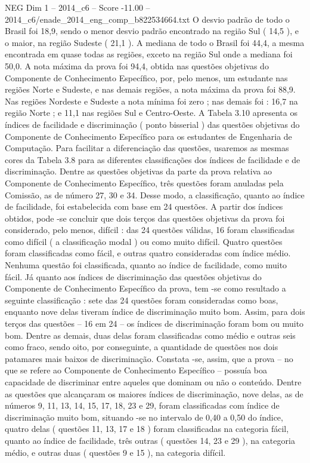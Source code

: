 \begin{textsample}{NEG Dim 1 – 2014\_c6 – Score -11.00 – 2014\_c6/enade\_2014\_eng\_comp\_b822534664.txt}
O desvio padrão de todo o Brasil foi 18,9, sendo o menor desvio padrão encontrado na região Sul ( 14,5 ), e o maior, na região Sudeste ( 21,1 ).
A mediana de todo o Brasil foi 44,4, a mesma encontrada em quase todas as regiões, exceto na região Sul onde a mediana foi 50,0.
A nota máxima da prova foi 94,4, obtida nas questões objetivas do Componente de Conhecimento Específico, por, pelo menos, um estudante nas regiões Norte e Sudeste, e nas demais regiões, a nota máxima da prova foi 88,9.
Nas regiões Nordeste e Sudeste a nota mínima foi zero ; nas demais foi : 16,7 na região Norte ; e 11,1 nas regiões Sul e Centro-Oeste.
A Tabela 3.10 apresenta os índices de facilidade e discriminação ( ponto bisserial ) das questões objetivas do Componente de Conhecimento Específico para os estudantes de Engenharia de Computação.
Para facilitar a diferenciação das questões, usaremos as mesmas cores da Tabela 3.8 para as diferentes classificações dos índices de facilidade e de discriminação.
Dentre as questões objetivas da parte da prova relativa ao Componente de Conhecimento Específico, três questões foram anuladas pela Comissão, as de número 27, 30 e 34.
Desse modo, a classificação, quanto ao índice de facilidade, foi estabelecida com base em 24 questões.
A partir dos índices obtidos, pode -se concluir que dois terços das questões objetivas da prova foi considerado, pelo menos, difícil : das 24 questões válidas, 16 foram classificadas como difícil ( a classificação modal ) ou como muito difícil.
Quatro questões foram classificadas como fácil, e outras quatro consideradas com índice médio.
Nenhuma questão foi classificada, quanto ao índice de facilidade, como muito fácil.
Já quanto aos índices de discriminação das questões objetivas do Componente de Conhecimento Específico da prova, tem -se como resultado a seguinte classificação : sete das 24 questões foram consideradas como boas, enquanto nove delas tiveram índice de discriminação muito bom.
Assim, para dois terços das questões – 16 em 24 – os índices de discriminação foram bom ou muito bom.
Dentre as demais, duas delas foram classificadas como médio e outras seis como fraco, sendo oito, por conseguinte, a quantidade de questões nos dois patamares mais baixos de discriminação.
Constata -se, assim, que a prova – no que se refere ao Componente de Conhecimento Específico – possuía boa capacidade de discriminar entre aqueles que dominam ou não o conteúdo.
Dentre as questões que alcançaram os maiores índices de discriminação, nove delas, as de números 9, 11, 13, 14, 15, 17, 18, 23 e 29, foram classificadas com índice de discriminação muito bom, situando -se no intervalo de 0,40 a 0,50 do índice, quatro delas ( questões 11, 13, 17 e 18 ) foram classificadas na categoria fácil, quanto ao índice de facilidade, três outras ( questões 14, 23 e 29 ), na categoria médio, e outras duas ( questões 9 e 15 ), na categoria difícil.

\end{textsample}
